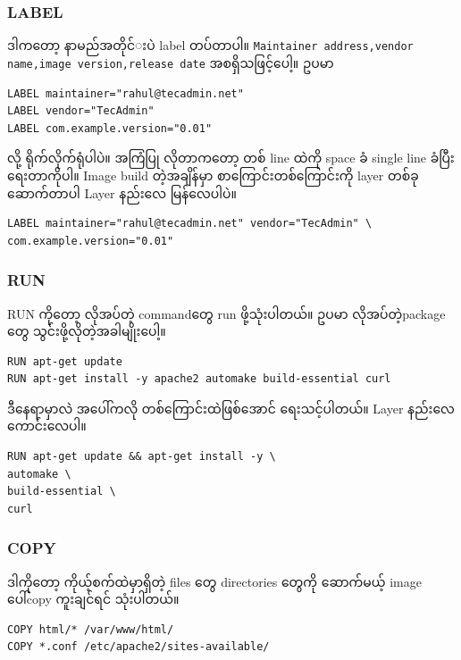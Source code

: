 \documentclass{article}
\begin{document}
\subsubsection{LABEL}\label{label}

ဒါက​တော့ နာမည်​အတိုင်​းပဲ label တပ်​တာပါ။
\texttt{Maintainer addres​s,vendor name,image version,release date}
အစရှိသဖြင့်​ပေါ့။ ဥပမာ

\begin{verbatim}
LABEL maintainer="rahul@tecadmin.net"
LABEL vendor="TecAdmin"
LABEL com.example.version="0.01"
\end{verbatim}

လို့ ရိုက်​လိုက်​ရုံပါပဲ။ အကြံပြု လိုတာက​တော့ တစ်​ line ထဲကို space ခံ
single line ခံပြီး ​ရေးတာကိုပါ။ Image build တဲ့အချိန်​မှာ
စာ​ကြောင်းတစ်​​ကြောင်းကို layer တစ်​ခု ​ဆောက်​တာပါ Layer နည်း​လေ
မြန်​​လေပါပဲ။

\begin{verbatim}
LABEL maintainer="rahul@tecadmin.net" vendor="TecAdmin" \
com.example.version="0.01"
\end{verbatim}

\subsubsection{RUN}\label{run}

RUN ကို​တော့ လိုအပ်​တဲ့ command​တွေ run ဖို့သုံးပါတယ်။ ဥပမာ
လိုအပ်တဲ့​package​တွေ သွင်းဖို့လိုတဲ့အခါမျိုး​ပေါ့။

\begin{verbatim}
RUN apt-get update 
RUN apt-get install -y apache2 automake build-essential curl ​​
\end{verbatim}

ဒီ​နေရာမှာလဲ အ​ပေါ်ကလို တစ်​​ကြောင်းထဲဖြစ်​​အောင်​ ​ရေးသင့်ပါတယ်​။ Layer
နည်း​လေ​ကောင်း​လေပါ။

\begin{verbatim}
RUN apt-get update && apt-get install -y \
automake \
build-essential \
curl
\end{verbatim}

\subsubsection{COPY}\label{copy}

ဒါကို​တော့ ကိုယ့်စက်​ထဲမှာရှိတဲ့ files ​တွေ directories ​တွေကို
​ဆောက်​မယ့် image ​ပေါ်copy ကူးချင်​ရင်​ သုံးပါတယ်။​

\begin{verbatim}
COPY html/* /var/www/html/
COPY *.conf /etc/apache2/sites-available/
\end{verbatim}
\end{document}
